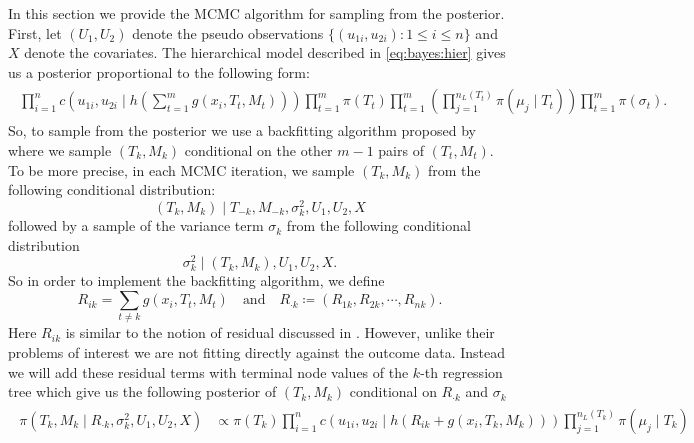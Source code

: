 \documentclass{amsart}
\begin{document}
In this section we provide the MCMC algorithm for sampling from the posterior. First, let $(U_1,U_2)$ denote the pseudo observations $\{(u_{1i},u_{2i}):1\le i \le n\}$ and $X$ denote the covariates. The hierarchical model described in \cref{eq:bayes:hier} gives us a posterior proportional to the following form:
\begin{align}
	\begin{split}
		\prod_{i=1}^{n}c\left(u_{1i},u_{2i}\mid h\left(\sum_{t=1}^m g(x_i, T_t, M_t)\right)\right)\prod_{t=1}^{m}\pi(T_t)\prod_{t=1}^{m}\left(\prod_{j=1}^{n_L(T_t)}\pi(\mu_j\mid T_t)\right)\prod_{t=1}^{m}\pi(\sigma_{t}).
	\end{split}
\end{align}
So, to sample from the posterior we use a backfitting algorithm proposed by \citet{chipman2010BART} where we sample $(T_k, M_k)$ conditional on the other $m-1$ pairs of $(T_t,M_t)$. To be more precise, in each MCMC iteration, we sample $(T_k, M_k)$ from the following conditional distribution: 
\begin{equation*}
	(T_k,M_k)\mid T_{-k},M_{-k}, \sigma^2_{k}, U_1, U_2, X
\end{equation*}
followed by a sample of the variance term $\sigma_{k}$ from the following conditional distribution
\begin{equation*}
	\sigma^2_{k} \mid (T_k,M_k),U_1,U_2,X.
\end{equation*}
So in order to implement the backfitting algorithm, we define 
\begin{equation*}
	R_{ik} = \sum_{t\not=k}g(x_i, T_t, M_t)\quad\text{and}\quad R_{\cdot k}\coloneqq(R_{1k},R_{2k},\cdots,R_{nk}).
\end{equation*}
Here $R_{ik}$ is similar to the notion of residual discussed in \citet{chipman2010BART, serafini2024lossbasedpriortreetopologies}. However, unlike their problems of interest we are not fitting directly against the outcome data. Instead we will add these residual terms with terminal node values of the $k$-th regression tree which give us the following posterior of $(T_k,M_k)$ conditional on $R_{\cdot k}$ and $\sigma_{k}$
\begin{align}\label{eq:post:res}
	\begin{split}
		\pi(T_k,M_k \mid R_{\cdot k}, \sigma^2_{k}, U_1,U_2, X) &\propto \pi(T_k)\prod_{i=1}^{n}c\left(u_{1i},u_{2i}\mid h\left(R_{ik}+g(x_i, T_k, M_k)\right)\right)\prod_{j=1}^{n_L(T_k)}\pi(\mu_j\mid T_k)
	\end{split}
\end{align}
\end{document}

